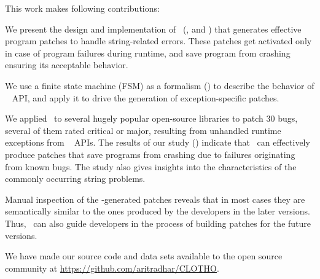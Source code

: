 This work makes following contributions:
\begin{mylist}

\item We present the design and implementation of \tool\ (,
 and ) that generates effective
program patches to handle string-related errors. These patches get activated
only in case of program failures during runtime, and save program from crashing
ensuring its acceptable behavior.
\item We use a finite state machine (FSM) as a formalism () to
describe the behavior of \java\  API, and apply it to drive the
generation of exception-specific patches.

\item We applied \tool\ to several hugely popular open-source libraries to patch
$30$ bugs, several of them rated critical or major, resulting from unhandled
runtime exceptions from \java\  APIs. The results of our study
() indicate that \tool\ can effectively produce patches that
save programs from crashing due to failures originating from known bugs. The
study also gives insights into the characteristics of the commonly occurring
string problems.

\item Manual inspection of the \tool-generated patches reveals that in most
cases they are semantically similar to the ones produced by the developers in
the later versions. %
Thus, \tool\ can also guide developers in the process of building patches for
the future versions.
\end{mylist}

We have made our source code and data sets available to the open source
community at \url{https://github.com/aritradhar/CLOTHO}.









